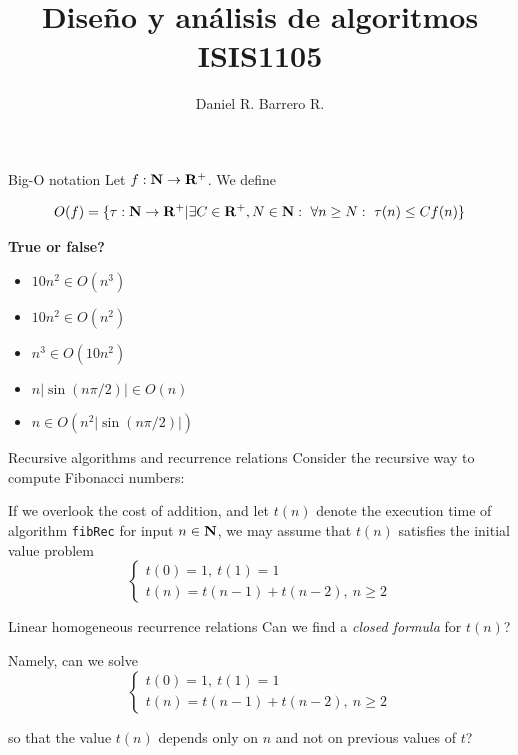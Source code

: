 \documentclass{beamer}
\title{Diseño y análisis de algoritmos \\ ISIS1105}
\author{Daniel R. Barrero R.}
\institute{Universidad de los Andes}
\begin{document}
\frame{\titlepage}

%

\begin{frame}{Big-O notation}
	Let $f : \mathbf{N} \to \mathbf{R}^+$. We define

	\begin{equation*}
		O(f) = \{\tau : \mathbf{N} \to \mathbf{R}^+ | \exists C \in \mathbf{R}^+, N \in \mathbf{N}:
		\ \forall n \geq N:\ \tau(n) \leq Cf(n)\}
	\end{equation*}

	\textbf{True or false?}
	\begin{itemize}
		\item $10n^2 \in O(n^3)$
		\item $10n^2 \in O(n^2)$
		\item $n^3 \in O(10n^2)$
		\item $n|\sin(n\pi/2)| \in O(n)$
		\item $n \in O(n^2|\sin(n\pi/2)|)$
	\end{itemize}
\end{frame}

%

\begin{frame}{Recursive algorithms and recurrence relations}
	Consider the recursive way to compute Fibonacci numbers:

	\pause

	If we overlook the cost of addition, and let $t(n)$ denote the execution
	time of algorithm \texttt{fibRec} for input $n \in \mathbf{N}$, we may assume that
	$t(n)$ satisfies the initial value problem
	\begin{displaymath}
		\begin{cases}
			t(0)= 1,\ t(1)= 1 \\
			t(n)= t(n-1) + t(n-2),\ n \geq 2
		\end{cases}
	\end{displaymath}
\end{frame}

%

\begin{frame}{Linear homogeneous recurrence relations}
	Can we find a \emph{closed formula} for $t(n)$?

	\bigskip
	Namely, can we solve
	\begin{displaymath}
		\begin{cases}
			t(0)= 1,\ t(1)= 1 \\
			t(n)= t(n-1) + t(n-2),\ n \geq 2
		\end{cases}
	\end{displaymath}

	so that the value $t(n)$ depends only on $n$ and not on previous values
	of $t$?
\end{frame}
\end{document}
